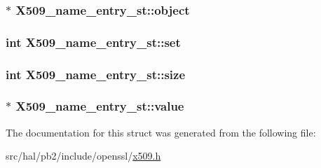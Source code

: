 \subsubsection[{\texorpdfstring{object}{object}}]{$\ast$ X509\+\_\+name\+\_\+entry\+\_\+st\+::object}\hypertarget{struct_x509__name__entry__st_afb5c2cccc0186d9b6c232d1abee1600d}{}\label{struct_x509__name__entry__st_afb5c2cccc0186d9b6c232d1abee1600d}
\subsubsection[{\texorpdfstring{set}{set}}]{\setlength{\rightskip}{0pt plus 5cm}int X509\+\_\+name\+\_\+entry\+\_\+st\+::set}\hypertarget{struct_x509__name__entry__st_a9c2a931466331baa5b1566029e4e2159}{}\label{struct_x509__name__entry__st_a9c2a931466331baa5b1566029e4e2159}
\subsubsection[{\texorpdfstring{size}{size}}]{\setlength{\rightskip}{0pt plus 5cm}int X509\+\_\+name\+\_\+entry\+\_\+st\+::size}\hypertarget{struct_x509__name__entry__st_a26441098da53088784c4eb95d3a2d2f7}{}\label{struct_x509__name__entry__st_a26441098da53088784c4eb95d3a2d2f7}
\subsubsection[{\texorpdfstring{value}{value}}]{$\ast$ X509\+\_\+name\+\_\+entry\+\_\+st\+::value}\hypertarget{struct_x509__name__entry__st_ac667219a50c24b022ad59fbd4b0161dd}{}\label{struct_x509__name__entry__st_ac667219a50c24b022ad59fbd4b0161dd}


The documentation for this struct was generated from the following file\+:\begin{DoxyCompactItemize}
\item 
src/hal/pb2/include/openssl/\hyperlink{x509_8h}{x509.\+h}\end{DoxyCompactItemize}
